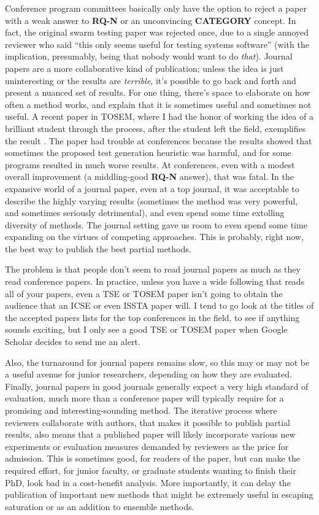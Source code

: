\documentclass[sigplan,review]{acmart}
\begin{document}
Conference program committees basically only have the option to reject
a paper with a weak answer to {\bf RQ-N} or an unconvincing {\bf
  CATEGORY} concept.  In fact, the original swarm testing paper was
rejected once, due to a single annoyed reviewer who said ``this only seems useful for
testing systems software'' (with the implication, presumably, being
that nobody would want to do \emph{that}).  Journal papers are a more
collaborative kind of publication; unless the idea is just
uninteresting or the results are \emph{terrible}, it's possible to go
back and forth and present a nuanced set of results.  For one thing,
there's space to elaborate on how often a method works, and explain
that it is sometimes useful and sometimes not useful.  A recent paper
in TOSEM, where I had the honor of working the idea of a brilliant
student through the process, after the student left the field,
exemplifies the result \cite{HolmesLOC}.  The paper had trouble at
conferences because the results showed that sometimes the proposed
test generation heuristic was harmful, and for some programs resulted
in much worse results.  At conferences, even with a modest overall
improvement (a middling-good {\bf RQ-N} answer), that was fatal.  In
the expansive world of a journal paper, even at a top journal, it was
acceptable to describe the highly varying results (sometimes the
method was very powerful, and sometimes seriously detrimental), and
even spend some time extolling diversity of methods.  The journal
setting gave us room to even spend some time expanding on the virtues
of competing approaches.  This is probably, right now, the best way to
publish the best partial methods.

The problem is that people don't seem to read journal papers as much
as they read conference papers.  In practice, unless you have a wide
following that reads all of your papers, even a TSE or TOSEM paper
isn't going to obtain the audience that an ICSE or even ISSTA paper
will.  I tend to go look at the titles of the accepted papers lists for the
top conferences in the field, to see if anything sounds exciting, but I only see a good TSE or TOSEM
paper when Google Scholar decides to send me an alert.

Also, the turnaround for journal papers remains slow, so this
may or may not be a useful avenue for junior researchers, depending on
how they are evaluated.  Finally, journal papers in good journals generally expect a
very high standard of evaluation, much more than a conference paper
will typically require for a promising and interesting-sounding
method.  The iterative process where reviewers collaborate with
authors, that makes it possible to publish partial results, also means
that a published paper will likely incorporate various new experiments
or evaluation measures demanded by reviewers as the price for
admission.  This is sometimes good, for readers of the paper, but can make the required effort,
for junior faculty, or graduate students wanting to finish their PhD,
look bad in a cost-benefit analysis.  More importantly, it can delay
the publication of important new methods that might be extremely
useful in escaping saturation or as an addition to ensemble methods.
\end{document}
